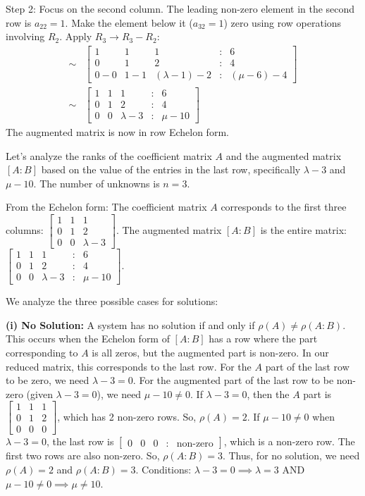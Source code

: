 \documentclass{article}
\begin{document}
Step 2: Focus on the second column. The leading non-zero element in the second row is $a_{22}=1$. Make the element below it ($a_{32}=1$) zero using row operations involving $R_2$.
Apply $R_3 \to R_3 - R_2$:
\begin{align*} \sim &\begin{bmatrix} 1 & 1 & 1 & : & 6 \\ 0 & 1 & 2 & : & 4 \\ 0 - 0 & 1 - 1 & (\lambda - 1) - 2 & : & (\mu - 6) - 4 \end{bmatrix} \\ \sim &\begin{bmatrix} 1 & 1 & 1 & : & 6 \\ 0 & 1 & 2 & : & 4 \\ 0 & 0 & \lambda - 3 & : & \mu - 10 \end{bmatrix}\end{align*}
The augmented matrix is now in row Echelon form.

Let's analyze the ranks of the coefficient matrix $A$ and the augmented matrix $[A:B]$ based on the value of the entries in the last row, specifically $\lambda - 3$ and $\mu - 10$. The number of unknowns is $n=3$.

From the Echelon form:
The coefficient matrix $A$ corresponds to the first three columns: $\begin{bmatrix} 1 & 1 & 1 \\ 0 & 1 & 2 \\ 0 & 0 & \lambda-3 \end{bmatrix}$.
The augmented matrix $[A:B]$ is the entire matrix: $\begin{bmatrix} 1 & 1 & 1 & : & 6 \\ 0 & 1 & 2 & : & 4 \\ 0 & 0 & \lambda-3 & : & \mu-10 \end{bmatrix}$.

We analyze the three possible cases for solutions:

\textbf{(i) No Solution:}
A system has no solution if and only if $\rho(A) \neq \rho(A:B)$.
This occurs when the Echelon form of $[A:B]$ has a row where the part corresponding to $A$ is all zeros, but the augmented part is non-zero. In our reduced matrix, this corresponds to the last row.
For the $A$ part of the last row to be zero, we need $\lambda - 3 = 0$.
For the augmented part of the last row to be non-zero (given $\lambda - 3 = 0$), we need $\mu - 10 \neq 0$.
If $\lambda - 3 = 0$, then the $A$ part is $\begin{bmatrix} 1 & 1 & 1 \\ 0 & 1 & 2 \\ 0 & 0 & 0 \end{bmatrix}$, which has 2 non-zero rows. So, $\rho(A) = 2$.
If $\mu - 10 \neq 0$ when $\lambda - 3 = 0$, the last row is $\begin{bmatrix} 0 & 0 & 0 & : & \text{non-zero} \end{bmatrix}$, which is a non-zero row. The first two rows are also non-zero. So, $\rho(A:B) = 3$.
Thus, for no solution, we need $\rho(A) = 2$ and $\rho(A:B) = 3$.
Conditions: $\lambda - 3 = 0 \implies \lambda = 3$ AND $\mu - 10 \neq 0 \implies \mu \neq 10$.
\end{document}
